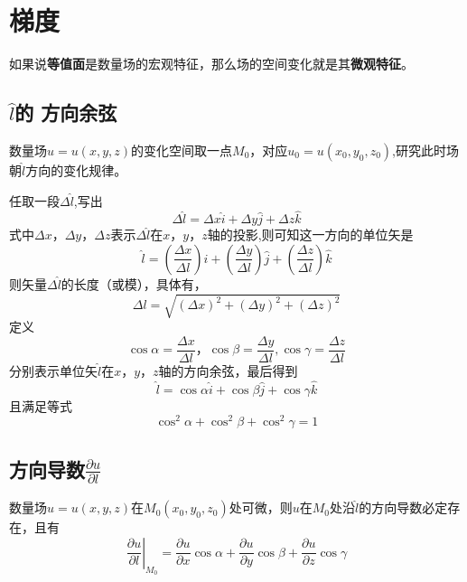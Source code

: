 \chapter{梯度}
如果说\textbf{等值面}是数量场的宏观特征，那么场的空间变化就是其\textbf{微观特征}。
\section{$ \hat{l} $的 方向余弦}
数量场$ u=u\left(x,y,z\right) $的变化空间取一点$ M_0 $，对应$ u_0=u\left(x_0,y_0,z_0\right) $,研究此时场朝$ \hat{l} $方向的变化规律。

任取一段$ \Delta \hat{l} $,写出
\[ \Delta \hat{l}=\Delta x\hat{i}+\Delta y\hat{j}+\Delta z\hat{k} \]
式中$ \Delta x $，$ \Delta y $，$ \Delta z $表示$ \Delta \hat{l} $在$ x$，$y$，$z $轴的投影,则可知这一方向的单位矢是
\[\hat{l}=\left( \frac{\Delta x}{\Delta l} \right) \hat{i} +\left( \frac{\Delta y}{\Delta l} \right) \hat{j}+\left( \frac{\Delta z}{\Delta l} \right) \hat{k} \]
则矢量$ \Delta \hat{l} $的长度（或模），具体有，
\[ \Delta l=\sqrt{\left( \Delta x \right) ^2+\left( \Delta y \right) ^2+\left( \Delta z \right) ^2} \]
定义
\[
\cos \alpha =\frac{\Delta x}{\Delta l}\text{，}\cos \beta =\frac{\Delta y}{\Delta l},\cos \gamma =\frac{\Delta z}{\Delta l}
\]
分别表示单位矢$ \hat{l} $在$ x$，$y$，$z $轴的方向余弦，最后得到
\[
\hat{l}=\cos \alpha \hat{i}+\cos \beta \hat{j}+\cos \gamma \hat{k}
\]
且满足等式
\[
\cos ^2\alpha +\cos ^2\beta +\cos ^2\gamma =1
\]

\section{方向导数$ \frac{\partial u}{\partial l} $}
数量场$ u=u\left(x,y,z\right) $在$ M_0\left(x_0,y_0,z_0\right) $处可微，则$ u $在$ M_0 $处沿$ \hat{l} $的方向导数必定存在，且有
\[
\left. \frac{\partial u}{\partial l} \right|_{M_0}=\frac{\partial u}{\partial x}\cos \alpha +\frac{\partial u}{\partial y}\cos \beta +\frac{\partial u}{\partial z}\cos \gamma 
\]

